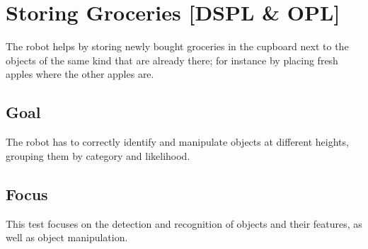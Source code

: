 \section{Storing Groceries [DSPL \& OPL]}
The robot helps by storing newly bought groceries in the cupboard next to the objects of the same kind that are already there; for instance by placing fresh apples where the other apples are.

\subsection{Goal}
The robot has to correctly identify and manipulate objects at different heights, grouping them by category and likelihood.

\subsection{Focus}
This test focuses on the detection and recognition of objects and their features, as well as object manipulation.


